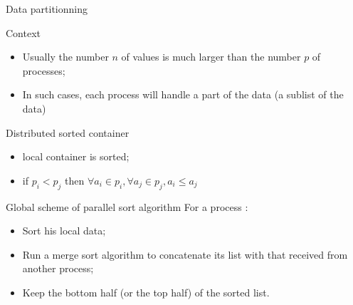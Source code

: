 \documentclass[compress,10pt,aspectratio=169]{beamer}
\begin{document}
\begin{frame}[fragile]{Data partitionning}
  \scriptsize
  \begin{block}{\small Context}
    \begin{itemize}
    \item Usually the number $n$ of values is much larger than the number $p$ of processes;
    \item In such cases, each process will handle a part of the data (a sublist of the data)
    \end{itemize}
  \end{block}

  \begin{alertblock}{\small Distributed sorted container}
    \begin{itemize}
    \item local container is sorted;
    \item if $p_{i}<p_{j}$ then
      $\forall a_{i}\in p_{i}, \forall a_{j}\in p_{j}, a_{i} \leq a_{j}$
    \end{itemize}
  \end{alertblock}
  
  \begin{exampleblock}{\small Global scheme of parallel sort algorithm}
    For a process :
    \begin{itemize}
    \item Sort his local data;
    \item Run a merge sort algorithm to concatenate its list with that received from another process;
    \item Keep the bottom half (or the top half) of the sorted list.
    \end{itemize}
  \end{exampleblock}
\end{frame}
\end{document}
